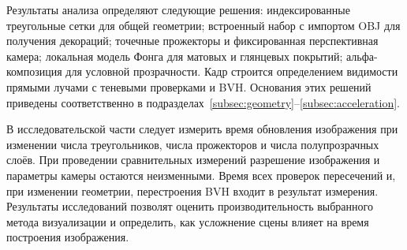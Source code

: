 Результаты анализа определяют следующие решения: индексированные треугольные сетки для общей геометрии; встроенный набор с импортом OBJ для получения декораций; точечные прожекторы и фиксированная перспективная камера; локальная модель Фонга для матовых и глянцевых покрытий; альфа-композиция для условной прозрачности. Кадр строится определением видимости прямыми лучами с теневыми проверками и BVH. Основания этих решений приведены соответственно в подразделах~\ref{subsec:geometry}--\ref{subsec:acceleration}.

В исследовательской части следует измерить время обновления изображения при изменении числа треугольников, числа прожекторов и числа полупрозрачных слоёв. При проведении сравнительных измерений разрешение изображения и параметры камеры остаются неизменными. Время всех проверок пересечений и, при изменении геометрии, перестроения BVH входит в результат измерения. Результаты исследований позволят оценить производительность выбранного метода визуализации и определить, как усложнение сцены влияет на время построения изображения.

\newpage
\endgroup
